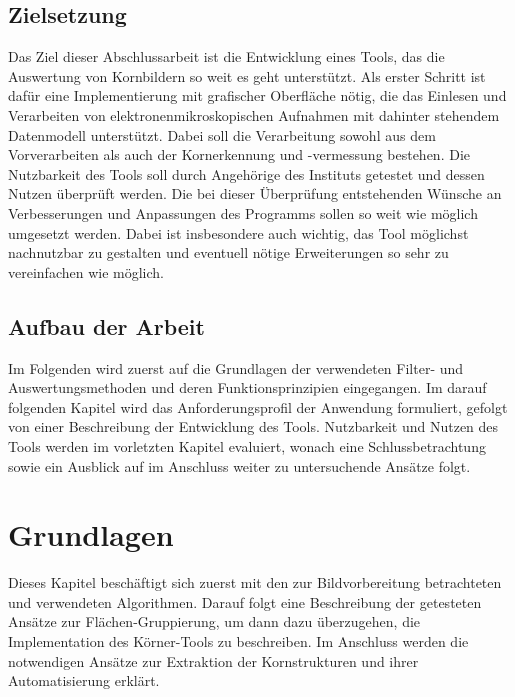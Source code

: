 \documentclass[
  12pt,
  openany]{book}
\begin{document}
\hypertarget{zielsetzung}{%
\section{Zielsetzung}\label{zielsetzung}}

Das Ziel dieser Abschlussarbeit ist die Entwicklung eines Tools, das die Auswertung von Kornbildern so weit es geht unterstützt.
Als erster Schritt ist dafür eine Implementierung mit grafischer Oberfläche nötig, die das Einlesen und Verarbeiten von elektronenmikroskopischen Aufnahmen mit dahinter stehendem Datenmodell unterstützt.
Dabei soll die Verarbeitung sowohl aus dem Vorverarbeiten als auch der Kornerkennung und -vermessung bestehen.
Die Nutzbarkeit des Tools soll durch Angehörige des Instituts getestet und dessen Nutzen überprüft werden. Die bei dieser Überprüfung entstehenden Wünsche an Verbesserungen und Anpassungen des Programms sollen so weit wie möglich umgesetzt werden.
Dabei ist insbesondere auch wichtig, das Tool möglichst nachnutzbar zu gestalten und eventuell nötige Erweiterungen so sehr zu vereinfachen wie möglich.

\hypertarget{aufbau-der-arbeit}{%
\section{Aufbau der Arbeit}\label{aufbau-der-arbeit}}

Im Folgenden wird zuerst auf die Grundlagen der verwendeten Filter- und Auswertungsmethoden und deren Funktionsprinzipien eingegangen.
Im darauf folgenden Kapitel wird das Anforderungsprofil der Anwendung formuliert, gefolgt von einer Beschreibung der Entwicklung des Tools.
Nutzbarkeit und Nutzen des Tools werden im vorletzten Kapitel evaluiert, wonach eine Schlussbetrachtung sowie ein Ausblick auf im Anschluss weiter zu untersuchende Ansätze folgt.

\hypertarget{grundlagen}{%
\chapter{Grundlagen}\label{grundlagen}}

Dieses Kapitel beschäftigt sich zuerst mit den zur Bildvorbereitung betrachteten und verwendeten Algorithmen. Darauf folgt eine Beschreibung der getesteten Ansätze zur Flächen-Gruppierung, um dann dazu überzugehen, die Implementation des Körner-Tools zu beschreiben.
Im Anschluss werden die notwendigen Ansätze zur Extraktion der Kornstrukturen und ihrer Automatisierung erklärt.
\end{document}
